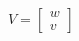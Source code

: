 \documentclass[preview]{standalone}
\begin{document}
\begin{center}
$V =\begin{bmatrix}w\\v\end{bmatrix}$
\end{center}
\end{document}
